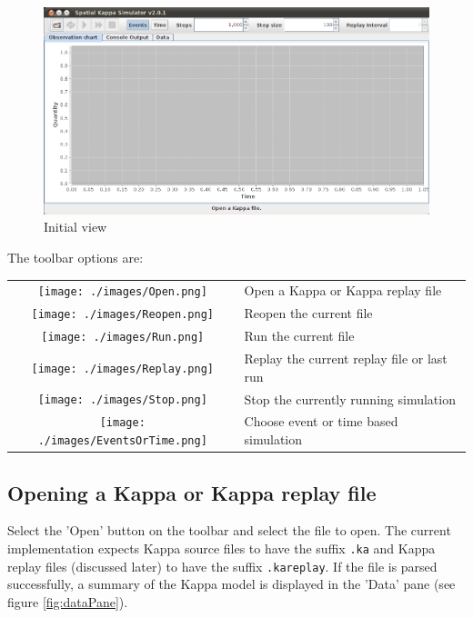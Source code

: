 \begin{figure}[h!]
 \centering
 \includegraphics[scale=0.3]{./images/startup.png}
 \caption{Initial view}
 \label{fig:startup}
\end{figure}

The toolbar options are:

\begin{tabular}{cl}
 \texttt{[image: ./images/Open.png]} & Open a Kappa or Kappa replay file \\
 \texttt{[image: ./images/Reopen.png]} & Reopen the current file  \\
 \texttt{[image: ./images/Run.png]} & Run the current file \\
 \texttt{[image: ./images/Replay.png]} & Replay the current replay file or last run \\
 \texttt{[image: ./images/Stop.png]} & Stop the currently running simulation \\
 \texttt{[image: ./images/EventsOrTime.png]} & Choose event or time based simulation \\
\end{tabular}

\subsection{Opening a Kappa or Kappa replay file}

Select the 'Open' button on the toolbar and select the file to open. The current implementation expects Kappa source files to have the suffix \verb|.ka| and Kappa replay files (discussed later) to have the suffix \verb|.kareplay|. If the file is parsed successfully, a summary of the Kappa model is displayed in the 'Data' pane (see figure \ref{fig:dataPane}). 


